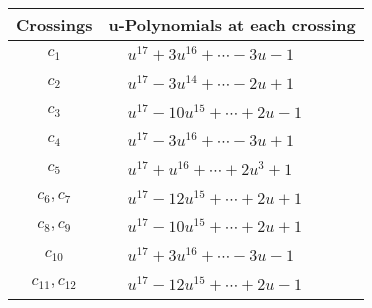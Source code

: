 \documentclass[1p]{elsarticle_modified}
\theoremstyle{definition}
\begin{document}
\begin{tabular}{m{50pt}|m{274pt}}
Crossings & \hspace{64pt}u-Polynomials at each crossing \\
\hline $$\begin{aligned}c_{1}\end{aligned}$$&$\begin{aligned}
&u^{17}+3 u^{16}+\cdots-3 u-1
\end{aligned}$\\
\hline $$\begin{aligned}c_{2}\end{aligned}$$&$\begin{aligned}
&u^{17}-3 u^{14}+\cdots-2 u+1
\end{aligned}$\\
\hline $$\begin{aligned}c_{3}\end{aligned}$$&$\begin{aligned}
&u^{17}-10 u^{15}+\cdots+2 u-1
\end{aligned}$\\
\hline $$\begin{aligned}c_{4}\end{aligned}$$&$\begin{aligned}
&u^{17}-3 u^{16}+\cdots-3 u+1
\end{aligned}$\\
\hline $$\begin{aligned}c_{5}\end{aligned}$$&$\begin{aligned}
&u^{17}+u^{16}+\cdots+2 u^3+1
\end{aligned}$\\
\hline $$\begin{aligned}c_{6},c_{7}\end{aligned}$$&$\begin{aligned}
&u^{17}-12 u^{15}+\cdots+2 u+1
\end{aligned}$\\
\hline $$\begin{aligned}c_{8},c_{9}\end{aligned}$$&$\begin{aligned}
&u^{17}-10 u^{15}+\cdots+2 u+1
\end{aligned}$\\
\hline $$\begin{aligned}c_{10}\end{aligned}$$&$\begin{aligned}
&u^{17}+3 u^{16}+\cdots-3 u-1
\end{aligned}$\\
\hline $$\begin{aligned}c_{11},c_{12}\end{aligned}$$&$\begin{aligned}
&u^{17}-12 u^{15}+\cdots+2 u-1
\end{aligned}$\\
\hline
\end{tabular}\\~\\
\end{document}
